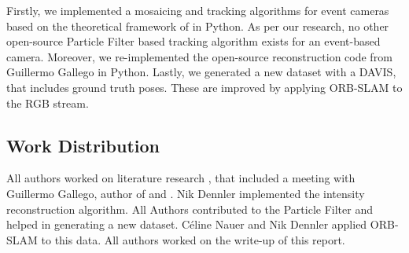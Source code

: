 \documentclass[10pt,twocolumn,letterpaper]{article}
\begin{document}
Firstly, we implemented a mosaicing and tracking algorithms for event cameras based on the theoretical framework of \cite{kim2014simultaneous} in Python. As per our research, no other open-source Particle Filter based tracking algorithm exists for an event-based camera.
Moreover, we re-implemented the open-source reconstruction code from Guillermo Gallego in Python. 
Lastly, we generated a new dataset with a DAVIS, that includes ground truth poses. These are improved by applying ORB-SLAM to the RGB stream.

\subsection{Work Distribution}
All authors worked on literature research , that included a meeting with Guillermo Gallego, author of \cite{EventVisionReview} and \cite{reinbacher}.
Nik Dennler implemented the intensity reconstruction algorithm. All Authors contributed to the Particle Filter and helped in generating a new dataset. C\'eline Nauer and Nik Dennler applied ORB-SLAM to this data. All authors worked on the write-up of this report.

\newpage

{\small



}
\end{document}
